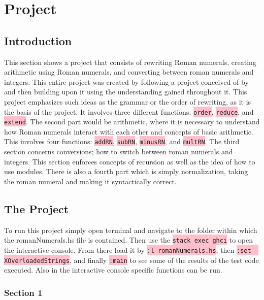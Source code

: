 \documentclass{article}
\begin{document}
\section{Project}

\subsection{Introduction}

This section shows a project that consists of rewriting Roman numerals, creating arithmetic using Roman numerals, and converting between roman numerals and integers. This entire project was created by following a project conceived of by \cite{RNC} and then building upon it using the understanding gained throughout it. This project emphasizes such ideas as the grammar or the order of rewriting, as it is the basis of the project. It involves three different functions: \colorbox{pink}{ \lstinline{order}}, \colorbox{pink}{ \lstinline{reduce}}, and \colorbox{pink}{ \lstinline{extend}}. The second part would be arithmetic, where it is necessary to understand how Roman numerals interact with each other and concepts of basic arithmetic. This involves four functions: \colorbox{pink}{ \lstinline{addRN}}, \colorbox{pink}{ \lstinline{subRN}}, \colorbox{pink}{ \lstinline{minusRN}}, and \colorbox{pink}{ \lstinline{multRN}}. The third section concerns conversions; how to switch between roman numerals and integers. This section enforces concepts of recursion as well as the idea of how to use modules. There is also a fourth part which is simply normalization, taking the roman numeral and making it syntactically correct.

\subsection{The Project}
To run this project simply open terminal and navigate to the folder within which the romanNumerals.hs file is contained. Then use the \colorbox{pink}{ \lstinline{stack exec ghci}} to open the interactive console. From there load it by \colorbox{pink}{ \lstinline{:l romanNumerals.hs}}, then \colorbox{pink}{ \lstinline{:set -XOverloadedStrings}}, and finally \colorbox{pink}{ \lstinline{:main}} to see some of the results of the test code executed. Also in the interactive console specific functions can be run.

\subsubsection{Section 1}
\end{document}
